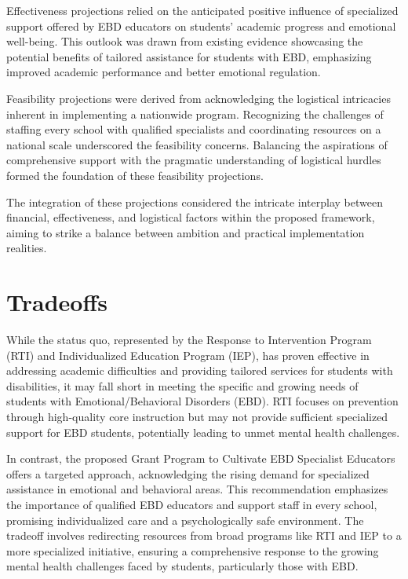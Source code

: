 \documentclass[11pt]{article}
\begin{document}
Effectiveness projections relied on the anticipated positive influence of specialized support offered by EBD educators on students' academic progress and emotional well-being. This outlook was drawn from existing evidence showcasing the potential benefits of tailored assistance for students with EBD, emphasizing improved academic performance and better emotional regulation.

Feasibility projections were derived from acknowledging the logistical intricacies inherent in implementing a nationwide program. Recognizing the challenges of staffing every school with qualified specialists and coordinating resources on a national scale underscored the feasibility concerns. Balancing the aspirations of comprehensive support with the pragmatic understanding of logistical hurdles formed the foundation of these feasibility projections.

The integration of these projections considered the intricate interplay between financial, effectiveness, and logistical factors within the proposed framework, aiming to strike a balance between ambition and practical implementation realities.

\section{Tradeoffs}

While the status quo, represented by the Response to Intervention Program (RTI) and Individualized Education Program (IEP), has proven effective in addressing academic difficulties and providing tailored services for students with disabilities, it may fall short in meeting the specific and growing needs of students with Emotional/Behavioral Disorders (EBD). RTI focuses on prevention through high-quality core instruction but may not provide sufficient specialized support for EBD students, potentially leading to unmet mental health challenges.

In contrast, the proposed Grant Program to Cultivate EBD Specialist Educators offers a targeted approach, acknowledging the rising demand for specialized assistance in emotional and behavioral areas. This recommendation emphasizes the importance of qualified EBD educators and support staff in every school, promising individualized care and a psychologically safe environment. The tradeoff involves redirecting resources from broad programs like RTI and IEP to a more specialized initiative, ensuring a comprehensive response to the growing mental health challenges faced by students, particularly those with EBD.
\end{document}
